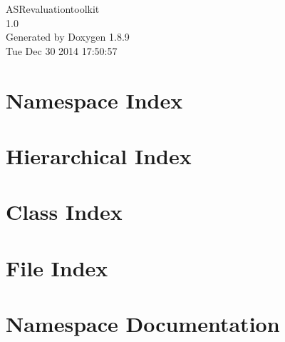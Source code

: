 \documentclass[twoside]{book}
\newcommand{\+}{\discretionary{\mbox{\scriptsize$\hookleftarrow$}}{}{}}
\newcommand{\clearemptydoublepage}{%
  \newpage{\pagestyle{empty}\cleardoublepage}%
}
\begin{document}
\begin{titlepage}
\vspace*{7cm}
\begin{center}%
{\Large A\+S\+Revaluationtoolkit \\[1ex]\large 1.\+0 }\\
\vspace*{1cm}
{\large Generated by Doxygen 1.8.9}\\
\vspace*{0.5cm}
{\small Tue Dec 30 2014 17:50:57}\\
\end{center}
\end{titlepage}
\clearemptydoublepage
\tableofcontents
\clearemptydoublepage
{}

\chapter{Namespace Index}

\chapter{Hierarchical Index}

\chapter{Class Index}

\chapter{File Index}

\chapter{Namespace Documentation}








\end{document}
